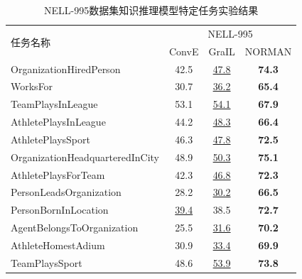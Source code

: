 \documentclass[algorithmlist, AutoFakeBold, AutoFakeSlant, figurelist, tablelist, nomlist, engineering, openany]{seuthesix} %
\begin{document}
\begin{table}[t]
  \centering
  \caption{NELL-995数据集知识推理模型特定任务实验结果}
  \begin{tabular*}{0.95\textwidth}{@{\extracolsep{\fill}}lccc}
    \toprule[1pt]
    \multirow{2}{*}{\small{任务名称}} & \multicolumn{3}{c}{\small{NELL-995}} \\
      & \small{ConvE} & \small{GraIL} & \small{NORMAN} \\ \hline
    \small{OrganizationHiredPerson} & 42.5 & \underline{47.8} & \textbf{74.3} \\
    \small{WorksFor} & 30.7 & \underline{36.2} & \textbf{65.4} \\
    \small{TeamPlaysInLeague} & 53.1 & \underline{54.1} & \textbf{67.9} \\
    \small{AthletePlaysInLeague} & 44.2 & \underline{48.3} & \textbf{66.4} \\
    \small{AthletePlaysSport} & 46.3 & \underline{47.8} & \textbf{72.5} \\
    \small{OrganizationHeadquarteredInCity} & 48.9 & \underline{50.3} & \textbf{75.1} \\
    \small{AthletePlaysForTeam} & 42.3 & \underline{46.8} & \textbf{72.3} \\
    \small{PersonLeadsOrganization} & 28.2 & \underline{30.2} & \textbf{66.5} \\
    \small{PersonBornInLocation} & \underline{39.4} & 38.5 & \textbf{72.7} \\
    \small{AgentBelongsToOrganization} & 25.5 & \underline{31.6} & \textbf{70.2} \\
    \small{AthleteHomestAdium} & 30.9 & \underline{33.4} & \textbf{69.9} \\
    \small{TeamPlaysSport} & 48.6 & \underline{53.9} & \textbf{73.8} \\
    \bottomrule[1pt]
  \end{tabular*}
  \label{Experiment1_tasks2}
\end{table}
\end{document}
